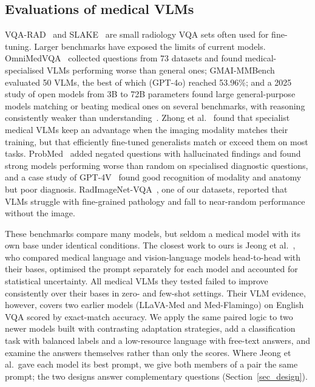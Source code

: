 \documentclass[doublecolumn]{ijcvsplatex}
\begin{document}
\subsection{Evaluations of medical VLMs}
VQA-RAD~\cite{lau2018vqarad} and SLAKE~\cite{liu2021slake} are small radiology VQA sets often used for fine-tuning. Larger benchmarks have exposed the limits of current models. OmniMedVQA~\cite{hu2024omnimedvqa} collected questions from 73 datasets and found medical-specialised VLMs performing worse than general ones; GMAI-MMBench~\cite{chen2024gmaimmbench} evaluated 50 VLMs, the best of which (GPT-4o) reached 53.96\%; and a 2025 study of open models from 3B to 72B parameters found large general-purpose models matching or beating medical ones on several benchmarks, with reasoning consistently weaker than understanding~\cite{liu2025howfar}. Zhong et al.~\cite{zhong2025generalist} found that specialist medical VLMs keep an advantage when the imaging modality matches their training, but that efficiently fine-tuned generalists match or exceed them on most tasks. ProbMed~\cite{yan2024probmed} added negated questions with hallucinated findings and found strong models performing worse than random on specialised diagnostic questions, and a case study of GPT-4V~\cite{wu2023gpt4vmed} found good recognition of modality and anatomy but poor diagnosis. RadImageNet-VQA~\cite{butsanets2025radimagenetvqa}, one of our datasets, reported that VLMs struggle with fine-grained pathology and fall to near-random performance without the image.

These benchmarks compare many models, but seldom a medical model with its own base under identical conditions. The closest work to ours is Jeong et al.~\cite{jeong2025limited}, who compared medical language and vision-language models head-to-head with their bases, optimised the prompt separately for each model and accounted for statistical uncertainty. All medical VLMs they tested failed to improve consistently over their bases in zero- and few-shot settings. Their VLM evidence, however, covers two earlier models (LLaVA-Med and Med-Flamingo) on English VQA scored by exact-match accuracy. We apply the same paired logic to two newer models built with contrasting adaptation strategies, add a classification task with balanced labels and a low-resource language with free-text answers, and examine the answers themselves rather than only the scores. Where Jeong et al.\ gave each model its best prompt, we give both members of a pair the same prompt; the two designs answer complementary questions (Section~\ref{sec_design}).
\end{document}
